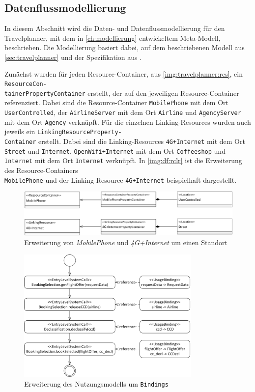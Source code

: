 \subsection{Datenflussmodellierung}
\label{sec:travelplanner:modellierung}
In diesem Abschnitt wird die Daten- und Datenflussmodellierung für den Travelplanner, mit dem in \autoref{ch:modellierung} entwickeltem Meta-Modell, beschrieben. Die Modellierung basiert dabei, auf dem beschriebenen Modell aus \autoref{sec:travelplanner} und der Spezifikation aus \cite{Kramera}. \par
Zunächst wurden für jeden Resource-Container, aus \autoref{img:travelplanner:res}, ein \texttt{ResourceCon-\\tainerPropertyContainer} erstellt, der auf den jeweiligen Resource-Container referenziert. Dabei sind die Resource-Container \texttt{MobilePhone} mit dem Ort \texttt{UserControlled}, der \texttt{AirlineServer} mit dem Ort \texttt{Airline} und \texttt{AgencyServer} mit dem Ort \texttt{Agency} verknüpft. Für die einzelnen Linking-Resources wurden auch jeweils ein \texttt{LinkingResourceProperty-\\Container} erstellt. Dabei sind die Linking-Resources \texttt{4G+Internet} mit dem Ort \texttt{Street} und \texttt{Internet}, \texttt{OpenWifi+Internet} mit dem Ort \texttt{Coffeeshop} und \texttt{Internet} mit dem Ort \texttt{Internet} verknüpft. In \autoref{img:df:rclr} ist die Erweiterung des Resource-Containers \\\texttt{MobilePhone} und der Linking-Resource \texttt{4G+Internet} beispielhaft dargestellt. \par
\begin{figure}[h]
	\centering
  	\includegraphics[width=1\textwidth]{images/df_rc_lr.png}
	\caption{Erweiterung von \textit{MobilePhone} und \textit{4G+Internet} um einen Standort}
	\label{img:df:rclr}
\end{figure}
\begin{figure}[h]
	\centering
  	\includegraphics[width=0.8\textwidth]{images/df_usage.png}
	\caption{Erweiterung des Nutzungsmodells um \texttt{Bindings}}
	\label{img:df:usage}
\end{figure}
